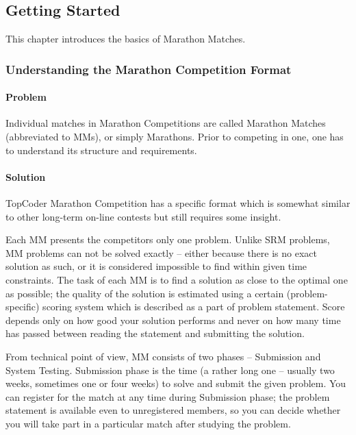 \hypertarget{getting-started}{%
\subsection{Getting Started}\label{getting-started}}

This chapter introduces the basics of Marathon Matches.

\hypertarget{understanding-the-marathon-competition-format}{%
\subsubsection{Understanding the Marathon Competition
Format}\label{understanding-the-marathon-competition-format}}

\hypertarget{problem}{%
\paragraph{Problem}\label{problem}}

Individual matches in Marathon Competitions are called Marathon Matches
(abbreviated to MMs), or simply Marathons. Prior to competing in one,
one has to understand its structure and requirements.

\hypertarget{solution}{%
\paragraph{Solution}\label{solution}}

TopCoder Marathon Competition has a specific format which is somewhat
similar to other long-term on-line contests but still requires some
insight.

Each MM presents the competitors only one problem. Unlike SRM problems,
MM problems can not be solved exactly -- either because there is no
exact solution as such, or it is considered impossible to find within
given time constraints. The task of each MM is to find a solution as
close to the optimal one as possible; the quality of the solution is
estimated using a certain (problem-specific) scoring system which is
described as a part of problem statement. Score depends only on how good
your solution performs and never on how many time has passed between
reading the statement and submitting the solution.

From technical point of view, MM consists of two phases -- Submission
and System Testing. Submission phase is the time (a rather long one --
usually two weeks, sometimes one or four weeks) to solve and submit the
given problem. You can register for the match at any time during
Submission phase; the problem statement is available even to
unregistered members, so you can decide whether you will take part in a
particular match after studying the problem.


